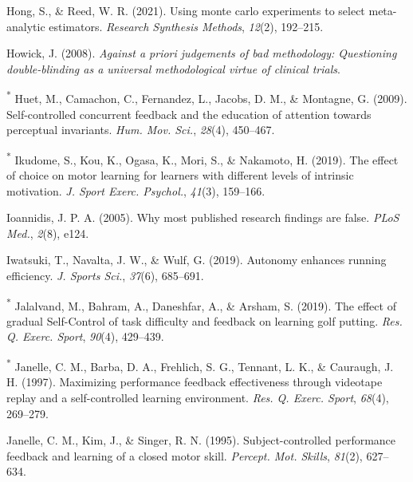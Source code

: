 \documentclass[
  english,
  man,floatsintext]{apa7}
\newlength{\cslhangindent}
\newlength{\cslentryspacingunit} %
\newenvironment{CSLReferences}[2] %
 {%
  \setlength{\parindent}{0pt}
  \ifodd #1
  \let\oldpar\par
  \def\par{\hangindent=\cslhangindent\oldpar}
  \fi
  \setlength{\parskip}{#2\cslentryspacingunit}
 }%
 {}
\begin{document}
\begin{CSLReferences}{1}{0}
\leavevmode{}%
Hong, S., \& Reed, W. R. (2021). Using monte carlo experiments to select meta-analytic estimators. \emph{Research Synthesis Methods}, \emph{12}(2), 192--215.

\leavevmode{}%
Howick, J. (2008). \emph{Against a priori judgements of bad methodology: Questioning double-blinding as a universal methodological virtue of clinical trials}.

\leavevmode{}%
\textsuperscript{*} Huet, M., Camachon, C., Fernandez, L., Jacobs, D. M., \& Montagne, G. (2009). Self-controlled concurrent feedback and the education of attention towards perceptual invariants. \emph{Hum. Mov. Sci.}, \emph{28}(4), 450--467.

\leavevmode{}%
\textsuperscript{*} Ikudome, S., Kou, K., Ogasa, K., Mori, S., \& Nakamoto, H. (2019). The effect of choice on motor learning for learners with different levels of intrinsic motivation. \emph{J. Sport Exerc. Psychol.}, \emph{41}(3), 159--166.

\leavevmode{}%
Ioannidis, J. P. A. (2005). Why most published research findings are false. \emph{PLoS Med.}, \emph{2}(8), e124.

\leavevmode{}%
Iwatsuki, T., Navalta, J. W., \& Wulf, G. (2019). Autonomy enhances running efficiency. \emph{J. Sports Sci.}, \emph{37}(6), 685--691.

\leavevmode{}%
\textsuperscript{*} Jalalvand, M., Bahram, A., Daneshfar, A., \& Arsham, S. (2019). The effect of gradual {Self-Control} of task difficulty and feedback on learning golf putting. \emph{Res. Q. Exerc. Sport}, \emph{90}(4), 429--439.

\leavevmode{}%
\textsuperscript{*} Janelle, C. M., Barba, D. A., Frehlich, S. G., Tennant, L. K., \& Cauraugh, J. H. (1997). Maximizing performance feedback effectiveness through videotape replay and a self-controlled learning environment. \emph{Res. Q. Exerc. Sport}, \emph{68}(4), 269--279.

\leavevmode{}%
Janelle, C. M., Kim, J., \& Singer, R. N. (1995). Subject-controlled performance feedback and learning of a closed motor skill. \emph{Percept. Mot. Skills}, \emph{81}(2), 627--634.


\end{CSLReferences}
\end{document}
